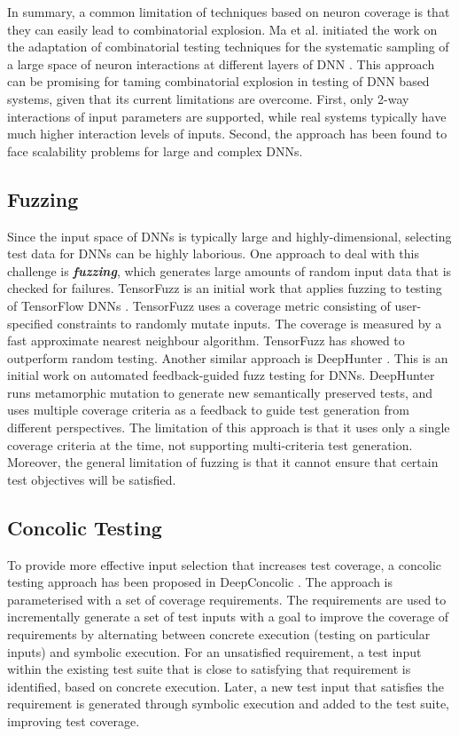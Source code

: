 \documentclass[letterpaper]{article} %
\begin{document}
In summary, a common limitation of techniques based on neuron coverage is that they can easily lead to combinatorial explosion. Ma et al. initiated the work on the adaptation of combinatorial testing techniques for the systematic sampling of a large space of neuron interactions at different layers of DNN \cite{Ma2018a}. This approach can be promising for taming combinatorial explosion in testing of DNN based systems, given that its current limitations are overcome. First, only 2-way interactions of input parameters are supported, while real systems typically have much higher interaction levels of inputs. Second, the approach has been found to face scalability problems for large and complex DNNs.

\subsection{Fuzzing}
Since the input space of DNNs is typically large and highly-dimensional, selecting test data for DNNs can be highly laborious. One approach to deal with this challenge is \textit{\textbf{fuzzing}}, which generates large amounts of random input data that is checked for failures. TensorFuzz is an initial work that applies fuzzing to testing of TensorFlow DNNs \cite{Odena2018}. TensorFuzz uses a coverage metric consisting of user-specified constraints to randomly mutate inputs. The coverage is measured by a fast approximate nearest neighbour algorithm. TensorFuzz has showed to outperform random testing. Another similar approach is DeepHunter \cite{Xie2018}. This is an initial work on automated feedback-guided fuzz testing for DNNs. DeepHunter runs metamorphic mutation to generate new semantically preserved tests, and uses multiple coverage criteria as a feedback to guide test generation from different perspectives. The limitation of this approach is that it uses only a single coverage criteria at the time, not supporting multi-criteria test generation. Moreover, the general limitation of fuzzing is that it cannot ensure that certain test objectives will be satisfied. 

\subsection{Concolic Testing}
To provide more effective input selection that increases test coverage, a concolic testing approach has been proposed in DeepConcolic \cite{Sun2018}. 
The approach is parameterised with a set of coverage requirements. The requirements are used to incrementally generate a set of test inputs with a goal to improve the coverage of requirements by alternating between concrete execution (testing on particular inputs) and symbolic execution. For an unsatisfied requirement, a test input within the existing test suite that is close to satisfying that requirement is identified, based on concrete execution. Later, a new test input that satisfies the requirement is generated through symbolic execution and added to the test suite, improving test coverage. 
\end{document}
